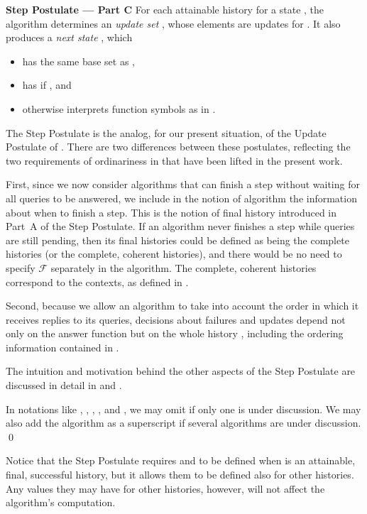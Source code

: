\documentclass{LMCS}
\theoremstyle{definition}
\newenvironment{ls}{\begin{itemize}}{\end{itemize}}
\newenvironment{unn}[1]{\bigskip\noindent\textbf{#1}\quad}{\par\bigskip}
\newcommand{\scr}[1]{\ensuremath{\mathcal {#1}}}
\begin{document}
\begin{unn}{Step Postulate --- Part C}
For each attainable history  for a state , the
algorithm determines an \emph{update set} , whose elements
are updates for .  It also produces a \emph{next state}
, which
\begin{ls}
  \item has the same base set as ,
  \item has  if , and
  \item otherwise interprets function symbols as in .
\end{ls}
\end{unn}

The Step Postulate is the analog, for our present situation, of the
Update Postulate of \cite{oa1}.  There are two differences between
these postulates, reflecting the two requirements of ordinariness in
\cite{oa1} that have been lifted in the present work.

First, since we now consider algorithms that can finish a step
without waiting for all queries to be answered, we include in the
notion of algorithm the information about when to finish a step.
This is the notion of final history introduced in Part~A of the Step
Postulate. If an algorithm never finishes a step while queries are
still pending, then its final histories could be defined as being
the complete histories (or the complete, coherent histories), and
there would be no need to specify \scr F separately in the
algorithm.  The complete, coherent histories correspond to the
contexts, as defined in \cite{oa1}.

Second, because we allow an algorithm to take into account the order
in which it receives replies to its queries, decisions about failures
and updates depend not only on the answer function  but on
the whole history , including the ordering information contained
in .

The intuition and motivation behind the other aspects of the Step
Postulate are discussed in detail in \cite{seqth} and \cite{oa1}.

\begin{conv}
  In notations like , , , , and
  , we may omit  if only one  is under discussion.  We
  may also add the algorithm  as a superscript if several
  algorithms are under discussion.
\qed\end{conv}

Notice that the Step Postulate requires  and 
to be defined when  is an attainable, final, successful history,
but it allows them to be defined also for other histories.  Any values
they may have for other histories, however, will not affect the
algorithm's computation.
\end{document}
